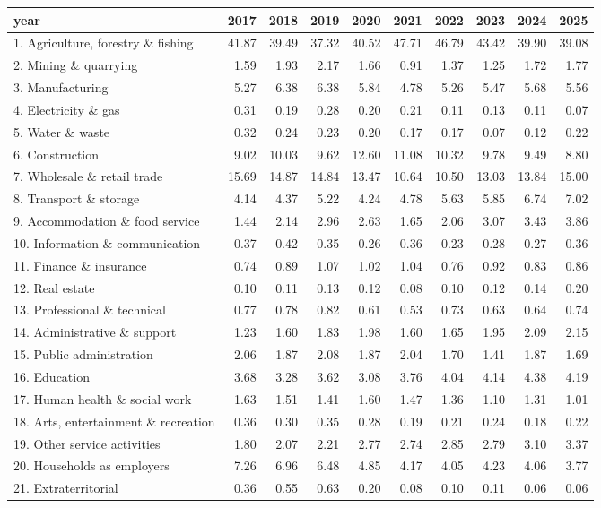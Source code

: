 \begin{tabular}{lrrrrrrrrr}
\toprule
year & 2017 & 2018 & 2019 & 2020 & 2021 & 2022 & 2023 & 2024 & 2025 \\
\midrule
1. Agriculture, forestry \& fishing & 41.87 & 39.49 & 37.32 & 40.52 & 47.71 & 46.79 & 43.42 & 39.90 & 39.08 \\
2. Mining \& quarrying & 1.59 & 1.93 & 2.17 & 1.66 & 0.91 & 1.37 & 1.25 & 1.72 & 1.77 \\
3. Manufacturing & 5.27 & 6.38 & 6.38 & 5.84 & 4.78 & 5.26 & 5.47 & 5.68 & 5.56 \\
4. Electricity \& gas & 0.31 & 0.19 & 0.28 & 0.20 & 0.21 & 0.11 & 0.13 & 0.11 & 0.07 \\
5. Water \& waste & 0.32 & 0.24 & 0.23 & 0.20 & 0.17 & 0.17 & 0.07 & 0.12 & 0.22 \\
6. Construction & 9.02 & 10.03 & 9.62 & 12.60 & 11.08 & 10.32 & 9.78 & 9.49 & 8.80 \\
7. Wholesale \& retail trade & 15.69 & 14.87 & 14.84 & 13.47 & 10.64 & 10.50 & 13.03 & 13.84 & 15.00 \\
8. Transport \& storage & 4.14 & 4.37 & 5.22 & 4.24 & 4.78 & 5.63 & 5.85 & 6.74 & 7.02 \\
9. Accommodation \& food service & 1.44 & 2.14 & 2.96 & 2.63 & 1.65 & 2.06 & 3.07 & 3.43 & 3.86 \\
10. Information \& communication & 0.37 & 0.42 & 0.35 & 0.26 & 0.36 & 0.23 & 0.28 & 0.27 & 0.36 \\
11. Finance \& insurance & 0.74 & 0.89 & 1.07 & 1.02 & 1.04 & 0.76 & 0.92 & 0.83 & 0.86 \\
12. Real estate & 0.10 & 0.11 & 0.13 & 0.12 & 0.08 & 0.10 & 0.12 & 0.14 & 0.20 \\
13. Professional \& technical & 0.77 & 0.78 & 0.82 & 0.61 & 0.53 & 0.73 & 0.63 & 0.64 & 0.74 \\
14. Administrative \& support & 1.23 & 1.60 & 1.83 & 1.98 & 1.60 & 1.65 & 1.95 & 2.09 & 2.15 \\
15. Public administration & 2.06 & 1.87 & 2.08 & 1.87 & 2.04 & 1.70 & 1.41 & 1.87 & 1.69 \\
16. Education & 3.68 & 3.28 & 3.62 & 3.08 & 3.76 & 4.04 & 4.14 & 4.38 & 4.19 \\
17. Human health \& social work & 1.63 & 1.51 & 1.41 & 1.60 & 1.47 & 1.36 & 1.10 & 1.31 & 1.01 \\
18. Arts, entertainment \& recreation & 0.36 & 0.30 & 0.35 & 0.28 & 0.19 & 0.21 & 0.24 & 0.18 & 0.22 \\
19. Other service activities & 1.80 & 2.07 & 2.21 & 2.77 & 2.74 & 2.85 & 2.79 & 3.10 & 3.37 \\
20. Households as employers & 7.26 & 6.96 & 6.48 & 4.85 & 4.17 & 4.05 & 4.23 & 4.06 & 3.77 \\
21. Extraterritorial & 0.36 & 0.55 & 0.63 & 0.20 & 0.08 & 0.10 & 0.11 & 0.06 & 0.06 \\
\bottomrule
\end{tabular}
